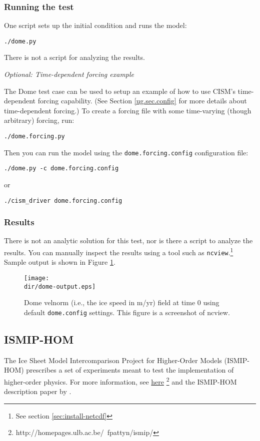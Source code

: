 \subsubsection{Running the test}
One script sets up the initial condition and runs the model:

\texttt{./dome.py}

There is not a script for analyzing the results.

\textit{Optional:  Time-dependent forcing example}

The Dome test case can be used to setup an example of how to use CISM's time-dependent
forcing capability.  (See Section \ref{ug.sec.config} for more details about time-dependent
forcing.)  To create a forcing file with some time-varying (though arbitrary) forcing, run:

\texttt{./dome.forcing.py}

Then you can run the model using the \texttt{dome.forcing.config} configuration file:

\texttt{./dome.py -c dome.forcing.config}

or

\texttt{./cism\_driver dome.forcing.config}


\subsubsection{Results}
There is not an analytic solution for this test, nor is there a script to analyze
the results.  You can manually inspect the results using a tool such as \texttt{ncview}.\footnote{See section \ref{sec:install-netcdf}}
Sample output is shown in Figure \ref{fig:domeresults}.
\begin{figure}[H!]
	\centering
	\texttt{[image: \\dir/dome-output.eps]}
	\caption{Dome velnorm (i.e., the ice speed in m/yr) field at time 0 using default \texttt{dome.config} settings. This figure is a screenshot of ncview.}
	\label{fig:domeresults}
\end{figure}
\FloatBarrier

\subsection{ISMIP-HOM}
The Ice Sheet Model Intercomparison Project for Higher-Order Models (ISMIP-HOM)
prescribes a set of experiments meant to test the implementation of higher-order physics.  
For more information, see \href{http://homepages.ulb.ac.be/~fpattyn/ismip/}{here}
\footnote{http://homepages.ulb.ac.be/~fpattyn/ismip/} and the ISMIP-HOM description paper by \citet{Pattyn2008}.

